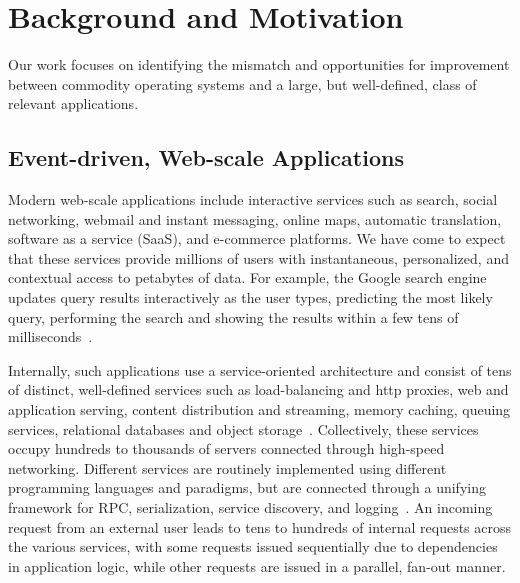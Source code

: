 
\section{Background and Motivation}
\label{sec:motivation}

Our work focuses on identifying the mismatch and opportunities for
improvement between commodity operating systems and a large, but
well-defined, class of relevant applications.

\subsection{Event-driven, Web-scale Applications}
\label{sec:motivation:web}

Modern web-scale applications include interactive services such as
search, social networking, webmail and instant messaging, online maps,
automatic translation, software as a service (SaaS), and e-commerce
platforms.  We have come to expect that these services provide
millions of users with instantaneous, personalized, and contextual
access to petabytes of data.  For example, the Google search engine
updates query results interactively as the user types, predicting the
most likely query, performing the search and showing the results
within a few tens of milliseconds~\cite{DBLP:journals/cacm/DeanB13}.

Internally, such applications use a service-oriented architecture and
consist of tens of distinct, well-defined services such as
load-balancing and http proxies, web and application serving, content
distribution and streaming, memory caching, queuing services,
relational databases and object
storage~\cite{DBLP:conf/sosp/DeCandiaHJKLPSVV07,Alonso:2010:WSC,Eriksen:2013:YSF}. 
Collectively, these services occupy
hundreds to thousands of servers connected through high-speed
networking. Different services are routinely implemented using
different programming languages and paradigms, but are connected
through a unifying framework for RPC, serialization, service
discovery, and logging~\cite{protocolbuffers, thrift, fingale,
  others}. An incoming request from an external user leads to tens to
hundreds of internal requests across the various services, with some
requests issued sequentially due to dependencies in application logic,
while other requests are issued in a parallel, fan-out manner.

